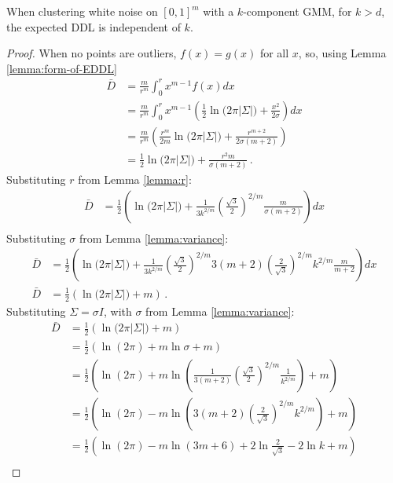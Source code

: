 \begin{lemma} \label{lemma:constant-when-no-outliers}
When clustering white noise on $[0,1]^m$ with a $k$-component GMM, for $k>d$, the expected DDL is independent of $k$. 
\end{lemma}
\begin{proof}
When no points are outliers, $f(x) = g(x)$ for all $x$, so, using Lemma \ref{lemma:form-of-EDDL}
\begin{align*}
    \bar{D} &= \frac{m}{r^m}\int_0^r x^{m-1} f(x) dx \\
            &= \frac{m}{r^m}\int_0^r x^{m-1} \left(\frac{1}{2} \ln{(2\pi |\Sigma|}) + \frac{x^2}{2\sigma}\right)  dx \\
            &= \frac{m}{r^m} \left(\frac{r^m}{2m} \ln{(2\pi |\Sigma|}) + \frac{r^{m+2}}{2\sigma(m+2)}\right) \\
            &= \frac{1}{2} \ln{(2\pi |\Sigma|}) + \frac{r^2 m}{\sigma(m+2)} \,.
\end{align*}
Substituting $r$ from Lemma \ref{lemma:r}:
\begin{align*}
    \bar{D} &= \frac{1}{2} \left(\ln{(2\pi |\Sigma|}) + \frac{1}{3k^{2/m}}\left(\frac{\sqrt{3}}{2}\right)^{2/m}\frac{m}{\sigma(m+2)}\right)  dx \\
\end{align*}
Substituting $\sigma$ from Lemma \ref{lemma:variance}:
\begin{align*}
    \bar{D} &= \frac{1}{2} \left(\ln{(2\pi |\Sigma|}) + \frac{1}{3k^{2/m}}\left(\frac{\sqrt{3}}{2}\right)^{2/m}3(m+2)\left(\frac{2}{\sqrt{3}}\right)^{2/m}k^{2/m}\frac{m}{m+2}\right)  dx \\
    \bar{D} &= \frac{1}{2} \left(\ln{(2\pi |\Sigma|}) + m \right) \,.
\end{align*}
Substituting $\Sigma=\sigma I$, with $\sigma$ from Lemma \ref{lemma:variance}:
\begin{align*}
    \bar{D} &= \frac{1}{2} \left(\ln{(2\pi |\Sigma|}) + m \right) \\
            &= \frac{1}{2} \left(\ln{(2\pi)} + m \ln{{\sigma}} + m \right) \\
            &= \frac{1}{2} \left(\ln{(2\pi)} + m \ln{\left(\frac{1}{3(m+2)}\left(\frac{\sqrt{3}}{2}\right)^{2/m}\frac{1}{k^{2/m}}\right)} + m \right) \\
            &= \frac{1}{2} \left(\ln{(2\pi)} - m \ln{\left(3(m+2)\left(\frac{2}{\sqrt{3}}\right)^{2/m}k^{2/m}\right)} + m \right) \\
            &= \frac{1}{2} \left(\ln{(2\pi)} - m \ln{(3m+6)} + 2\ln{\tfrac{2}{\sqrt{3}}} -2\ln{k} + m \right) \\

\end{align*}
\end{proof}

